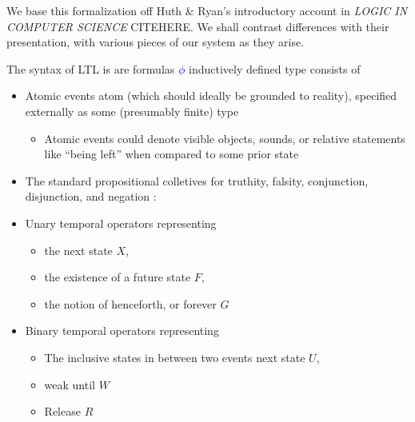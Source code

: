 \documentclass{article}
\newcommand{\blue}[1]{\textcolor{blue}{#1}}
\newcommand{\green}[1]{\textcolor{hooker\'sgreen}{#1}}
\begin{document}
We base this formalization off Huth \& Ryan's introductory account in
\emph{LOGIC IN COMPUTER SCIENCE} CITEHERE. We shall contrast differences with
their presentation, with various pieces of our system as they arise.

The syntax of LTL is are formulas \blue{$\phi$} inductively defined type consists of

\begin{itemize}
\item Atomic events \green{atom} (which should ideally be grounded to reality), specified externally as some (presumably finite) type
\begin{itemize}
\item Atomic events could denote visible objects, sounds, or relative statements like ``being left'' when compared to some prior state
\end{itemize}
\item The standard propositional colletives for truthity, falsity, conjunction, disjunction, and negation :
\item Unary temporal operators representing
\begin{itemize}
\item the next state \green{$X$},
\item the existence of a future state \green{$F$},
\item the notion of henceforth, or forever \green{$G$}
\end{itemize}
\item Binary temporal operators representing
\begin{itemize}
\item The inclusive states in between two events next state \green{$U$},
\item weak until \green{$W$}
\item Release \green{$R$}
\end{itemize}
\end{itemize}
\end{document}
